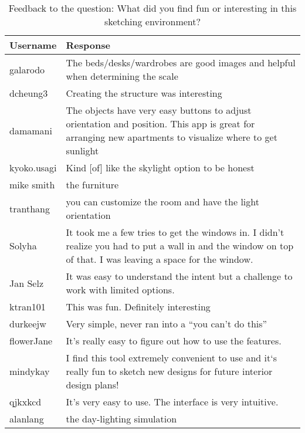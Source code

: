 \begin{table}[!ht]
\centering
\begin{tabular}{|p{}|p{}|}
\hline
\rowcolor[HTML]{EFEFEF} 
{\color[HTML]{000000} \textbf{Username}} & {\color[HTML]{000000} \textbf{Response}} \\ \hline
galarodo & The beds/desks/wardrobes are good images and helpful when determining the scale \\ \hline
dcheung3 & Creating the structure was interesting \\ \hline
damamani & The objects have very easy buttons to adjust orientation and position. This app is great for arranging new apartments to visualize where to get sunlight \\ \hline
kyoko.usagi & Kind {[}of{]} like the skylight option to be honest \\ \hline
mike smith & the furniture \\ \hline
tranthang & you can customize the room and have the light orientation \\ \hline
Solyha & It took me a few tries to get the windows in. I didn't realize you had to put a wall in and the window on top of that. I was leaving a space for the window. \\ \hline
Jan Selz & It was easy to understand the intent but a challenge to work with limited options. \\ \hline
ktran101 & This was fun. Definitely interesting \\ \hline
durkeejw & Very simple, never ran into a ``you can't do this'' \\ \hline
flowerJane & It's really easy to figure out how to use the features. \\ \hline
mindykay & I find this tool extremely convenient to use and it`s really fun to sketch new designs for future interior design plans! \\ \hline
qjkxkcd & It's very easy to use. The interface is very intuitive. \\ \hline
alanlang & the day-lighting simulation \\ \hline
\end{tabular}
\caption{Feedback to the question: What did you find fun or interesting in this sketching environment?}
\label{fig:fun}
\end{table}

